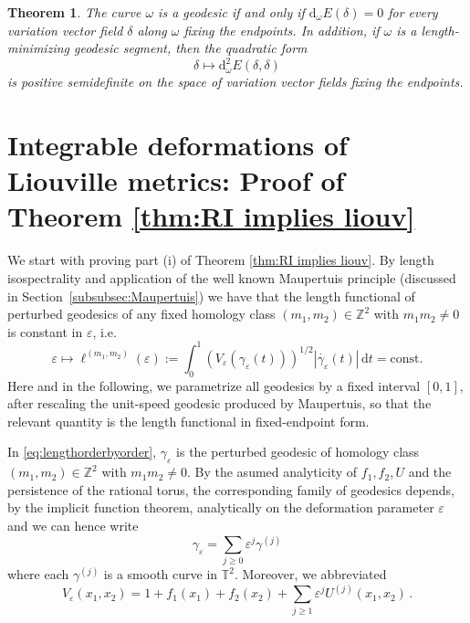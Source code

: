 \documentclass[11pt,letterpaper,oneside]{amsart}
\newcommand{\Z}{\mathbb{Z}}
\newcommand{\T}{\mathbb{T}}
\renewcommand{\epsilon}{\varepsilon}
\newtheorem{theo}{Theorem}[section]
\theoremstyle{definition}
\theoremstyle{remark}
\newcommand{\eps}{\varepsilon}
\newcommand{\const}{\text{const.}}
\theoremstyle{definition}
\theoremstyle{remark}
\newcommand{\dif}{\mathrm{d}}
\begin{document}
\begin{theo}\label{thm:variation of geod}
    The curve $\omega$ is a geodesic if and only if $\dif_\omega E(\delta)=0$ for every variation vector field $\delta$ along $\omega$ fixing the endpoints.
    In addition, if $\omega$ is a length-minimizing geodesic segment, then the quadratic form
    \[
        \delta \mapsto \dif_\omega^2 E(\delta,\delta)
    \]
    is positive semidefinite on the space of variation vector fields fixing the endpoints.
\end{theo}



\section{Integrable deformations of Liouville metrics: Proof of Theorem \ref{thm:RI implies liouv}} \label{sec:RIliouv}
 We start with proving part (i) of Theorem \ref{thm:RI implies liouv}. By length isospectrality and application of the well known Maupertuis principle (discussed in Section~\ref{subsubsec:Maupertuis}) we have that the length functional of perturbed geodesics of any fixed homology class $(m_1, m_2) \in \Z^2$ with $m_1 m_2 \neq 0$ is constant in $\epsilon$, i.e.
 \begin{equation} \label{eq:lengthorderbyorder}
\epsilon \mapsto \ell^{(m_1, m_2)}(\epsilon) := \int_0^{1}   \left( 
V_\epsilon(\gamma_\epsilon(t))\right)^{1/2} |\dot{\gamma_\epsilon}(t)| \, \dif t  = \const 
\end{equation}
Here and in the following, we parametrize all geodesics by a fixed interval $[0,1]$, after rescaling the unit-speed geodesic produced by Maupertuis, so that the relevant quantity is the length functional in fixed-endpoint form.

\medskip

In \eqref{eq:lengthorderbyorder}, $\gamma_\epsilon$ is the perturbed geodesic of homology class $(m_1, m_2) \in \Z^2$ with $m_1 m_2 \neq 0$. By the asumed analyticity of $f_1, f_2, U$ and the persistence of the rational torus, the corresponding family of geodesics depends, by the implicit function theorem, analytically on the deformation parameter $\eps$ and we can hence write
\begin{equation}
    \gamma_\epsilon = \sum_{j \ge 0} \epsilon^j \gamma^{(j)} 
\end{equation}
where each $\gamma^{(j)}$ is a smooth curve in $\T^2$. Moreover, we abbreviated 
\begin{equation*}
    V_\epsilon(x_1, x_2) = 1 + f_1(x_1) + f_2(x_2) + \sum_{j \ge 1} \epsilon^j U^{(j)}(x_1, x_2) \,. 
\end{equation*}
\end{document}
